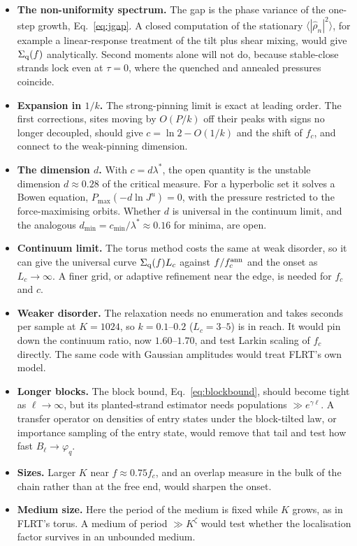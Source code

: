 \documentclass[10pt,a4paper]{article}
\newcommand{\Sq}{\Sigma_{\rm q}}
\begin{document}
\begin{itemize}
\item \textbf{The non-uniformity spectrum.} The gap is the phase variance of the one-step growth, Eq.~\eqref{eq:jgap}. A closed computation of the stationary $\langle|\hat\rho_n|^2\rangle$, for example a linear-response treatment of the tilt plus shear mixing, would give $\Sq(f)$ analytically. Second moments alone will not do, because stable-close strands lock even at $\tau=0$, where the quenched and annealed pressures coincide.
\item \textbf{Expansion in $1/k$.} The strong-pinning limit is exact at leading order. The first corrections, sites moving by $O(P/k)$ off their peaks with signs no longer decoupled, should give $c=\ln2-O(1/k)$ and the shift of $f_c$, and connect to the weak-pinning dimension.
\item \textbf{The dimension $d$.} With $c=d\lambda^*$, the open quantity is the unstable dimension $d\approx0.28$ of the critical measure. For a hyperbolic set it solves a Bowen equation, $P_{\max}(-d\ln J^u)=0$, with the pressure restricted to the force-maximising orbits. Whether $d$ is universal in the continuum limit, and the analogous $d_{\min}=c_{\min}/\lambda^*\approx0.16$ for minima, are open.
\item \textbf{Continuum limit.} The torus method costs the same at weak disorder, so it can give the universal curve $\Sq(f)L_c$ against $f/f_c^{\rm ann}$ and the onset as $L_c\to\infty$. A finer grid, or adaptive refinement near the edge, is needed for $f_c$ and $c$.
\item \textbf{Weaker disorder.} The relaxation needs no enumeration and takes seconds per sample at $K=1024$, so $k=0.1$--$0.2$ ($L_c=3$--$5$) is in reach. It would pin down the continuum ratio, now $1.60$--$1.70$, and test Larkin scaling of $f_c$ directly. The same code with Gaussian amplitudes would treat FLRT's own model.
\item \textbf{Longer blocks.} The block bound, Eq.~\eqref{eq:blockbound}, should become tight as $\ell\to\infty$, but its planted-strand estimator needs populations $\gg e^{\gamma\ell}$. A transfer operator on densities of entry states under the block-tilted law, or importance sampling of the entry state, would remove that tail and test how fast $B_\ell\to\varphi_q$.
\item \textbf{Sizes.} Larger $K$ near $f\approx0.75f_c$, and an overlap measure in the bulk of the chain rather than at the free end, would sharpen the onset.
\item \textbf{Medium size.} Here the period of the medium is fixed while $K$ grows, as in FLRT's torus. A medium of period $\gg K^\zeta$ would test whether the localisation factor survives in an unbounded medium.
\end{itemize}
\end{document}
